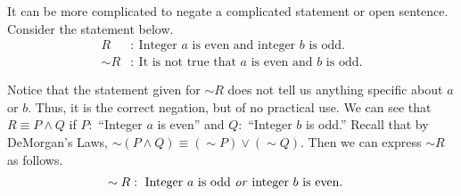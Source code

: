 \noindent It can be more complicated to negate a complicated statement or open sentence.  Consider the statement below.
	\begin{align*}
	R &: \ \mbox{Integer $a$ is even and integer $b$ is odd.}\\
	\sim R&: \ \mbox{It is not true that $a$ is even and $b$ is odd.}
	\end{align*}

Notice that the statement given for $\sim R$ does not tell us anything specific about $a$ or $b$.  Thus, it is the correct negation, but of no practical use.  We can see that $R \equiv P \wedge Q$ if $P:$ ``Integer $a$ is even'' and $Q:$ ``Integer $b$ is odd.''  Recall that by DeMorgan's Laws, $\sim (P \wedge Q) \equiv (\sim P) \vee (\sim Q)$.  Then we can express $\sim R$ as follows.
	\begin{align*}
	\sim R &: \ \mbox{Integer $a$ is odd \textit{or} integer $b$ is even.}
	\end{align*}
	
	
